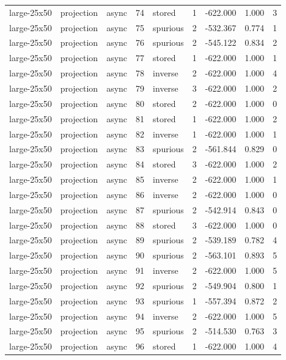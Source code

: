 \begin{tabular}{lllrlrrrr}
large-25x50 & projection & async & 74 & stored & 1 & -622.000 & 1.000 & 3 \\
large-25x50 & projection & async & 75 & spurious & 2 & -532.367 & 0.774 & 1 \\
large-25x50 & projection & async & 76 & spurious & 2 & -545.122 & 0.834 & 2 \\
large-25x50 & projection & async & 77 & stored & 1 & -622.000 & 1.000 & 1 \\
large-25x50 & projection & async & 78 & inverse & 2 & -622.000 & 1.000 & 4 \\
large-25x50 & projection & async & 79 & inverse & 3 & -622.000 & 1.000 & 2 \\
large-25x50 & projection & async & 80 & stored & 2 & -622.000 & 1.000 & 0 \\
large-25x50 & projection & async & 81 & stored & 1 & -622.000 & 1.000 & 2 \\
large-25x50 & projection & async & 82 & inverse & 1 & -622.000 & 1.000 & 1 \\
large-25x50 & projection & async & 83 & spurious & 2 & -561.844 & 0.829 & 0 \\
large-25x50 & projection & async & 84 & stored & 3 & -622.000 & 1.000 & 2 \\
large-25x50 & projection & async & 85 & inverse & 2 & -622.000 & 1.000 & 1 \\
large-25x50 & projection & async & 86 & inverse & 2 & -622.000 & 1.000 & 0 \\
large-25x50 & projection & async & 87 & spurious & 2 & -542.914 & 0.843 & 0 \\
large-25x50 & projection & async & 88 & stored & 3 & -622.000 & 1.000 & 0 \\
large-25x50 & projection & async & 89 & spurious & 2 & -539.189 & 0.782 & 4 \\
large-25x50 & projection & async & 90 & spurious & 2 & -563.101 & 0.893 & 5 \\
large-25x50 & projection & async & 91 & inverse & 2 & -622.000 & 1.000 & 5 \\
large-25x50 & projection & async & 92 & spurious & 2 & -549.904 & 0.800 & 1 \\
large-25x50 & projection & async & 93 & spurious & 1 & -557.394 & 0.872 & 2 \\
large-25x50 & projection & async & 94 & inverse & 2 & -622.000 & 1.000 & 5 \\
large-25x50 & projection & async & 95 & spurious & 2 & -514.530 & 0.763 & 3 \\
large-25x50 & projection & async & 96 & stored & 1 & -622.000 & 1.000 & 4 \\

\end{tabular}
